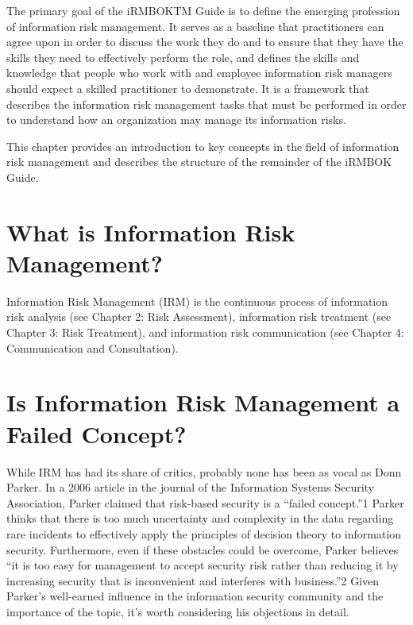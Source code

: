 The primary goal of the iRMBOKTM Guide is to define the emerging
profession of information risk management. It serves as a baseline that
practitioners can agree upon in order to discuss the work they do and to
ensure that they have the skills they need to effectively perform the
role, and defines the skills and knowledge that people who work with and
employee information risk managers should expect a skilled practitioner
to demonstrate. It is a framework that describes the information risk
management tasks that must be performed in order to understand how an
organization may manage its information risks.

This chapter provides an introduction to key concepts in the field of
information risk management and describes the structure of the remainder
of the iRMBOK Guide.

\section{What is Information Risk
Management?}\label{what-is-information-risk-management}

Information Risk Management (IRM) is the continuous process of
information risk analysis (see Chapter 2: Risk Assessment), information
risk treatment (see Chapter 3: Risk Treatment), and information risk
communication (see Chapter 4: Communication and Consultation).

\section{Is Information Risk Management a Failed
Concept?}\label{is-information-risk-management-a-failed-concept}

While IRM has had its share of critics, probably none has been as vocal
as Donn Parker. In a 2006 article in the journal of the Information
Systems Security Association, Parker claimed that risk-based security is
a ``failed concept.''1 Parker thinks that there is too much uncertainty
and complexity in the data regarding rare incidents to effectively apply
the principles of decision theory to information security. Furthermore,
even if these obstacles could be overcome, Parker believes ``it is too
easy for management to accept security risk rather than reducing it by
increasing security that is inconvenient and interferes with
business.''2 Given Parker's well-earned influence in the information
security community and the importance of the topic, it's worth
considering his objections in detail.

